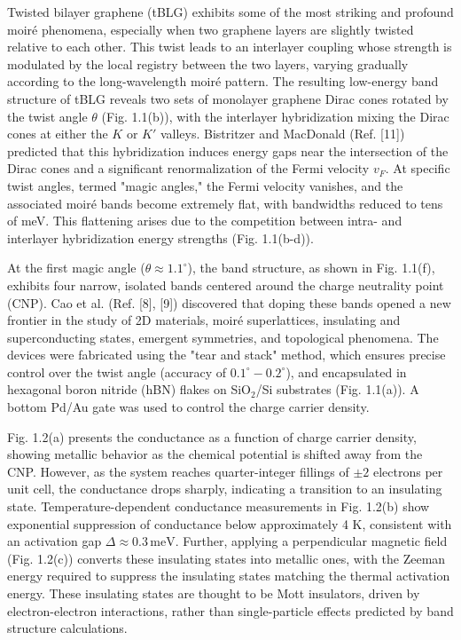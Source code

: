 Twisted bilayer graphene (tBLG) exhibits some of the most striking and profound moiré phenomena, especially when two graphene layers are slightly twisted relative to each other. This twist leads to an interlayer coupling whose strength is modulated by the local registry between the two layers, varying gradually according to the long-wavelength moiré pattern. The resulting low-energy band structure of tBLG reveals two sets of monolayer graphene Dirac cones rotated by the twist angle \(\theta\) (Fig. 1.1(b)), with the interlayer hybridization mixing the Dirac cones at either the \(K\) or \(K'\) valleys. Bistritzer and MacDonald (Ref. [11]) predicted that this hybridization induces energy gaps near the intersection of the Dirac cones and a significant renormalization of the Fermi velocity \(v_F\). At specific twist angles, termed "magic angles," the Fermi velocity vanishes, and the associated moiré bands become extremely flat, with bandwidths reduced to tens of meV. This flattening arises due to the competition between intra- and interlayer hybridization energy strengths (Fig. 1.1(b-d)).

At the first magic angle (\(\theta \approx 1.1^\circ\)), the band structure, as shown in Fig. 1.1(f), exhibits four narrow, isolated bands centered around the charge neutrality point (CNP). Cao et al. (Ref. [8], [9]) discovered that doping these bands opened a new frontier in the study of 2D materials, moiré superlattices, insulating and superconducting states, emergent symmetries, and topological phenomena. The devices were fabricated using the "tear and stack" method, which ensures precise control over the twist angle (accuracy of \(0.1^\circ - 0.2^\circ\)), and encapsulated in hexagonal boron nitride (hBN) flakes on SiO\(_2\)/Si substrates (Fig. 1.1(a)). A bottom Pd/Au gate was used to control the charge carrier density.

Fig. 1.2(a) presents the conductance as a function of charge carrier density, showing metallic behavior as the chemical potential is shifted away from the CNP. However, as the system reaches quarter-integer fillings of \(\pm 2\) electrons per unit cell, the conductance drops sharply, indicating a transition to an insulating state. Temperature-dependent conductance measurements in Fig. 1.2(b) show exponential suppression of conductance below approximately 4 K, consistent with an activation gap \(\Delta \approx 0.3 \, \text{meV}\). Further, applying a perpendicular magnetic field (Fig. 1.2(c)) converts these insulating states into metallic ones, with the Zeeman energy required to suppress the insulating states matching the thermal activation energy. These insulating states are thought to be Mott insulators, driven by electron-electron interactions, rather than single-particle effects predicted by band structure calculations.

